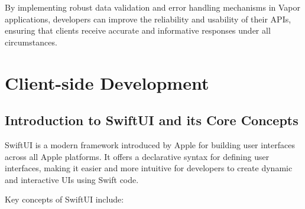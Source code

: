 \documentclass[
  biblatex,
  language=english,
  figures=false,
  sourcecodes,
  glossaries,
  index
]{kidiplom}
\begin{document}
By implementing robust data validation and error handling mechanisms in Vapor applications, developers can improve the reliability and usability of their APIs, ensuring that clients receive accurate and informative responses under all circumstances.


\section{Client-side Development}
\subsection{Introduction to SwiftUI and its Core Concepts}

SwiftUI is a modern framework introduced by Apple for building user interfaces across all Apple platforms. It offers a declarative syntax for defining user interfaces, making it easier and more intuitive for developers to create dynamic and interactive UIs using Swift code.

Key concepts of SwiftUI include:
\end{document}
